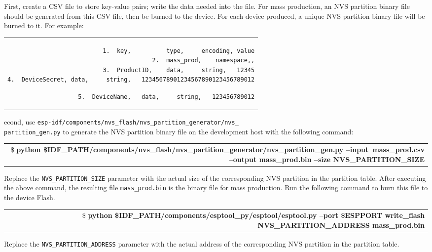 \documentclass[a4paper,12pt,openany]{book}
\renewcommand{\ttfamily}{\fontfamily{pcr}\selectfont}
\renewcommand{\arraystretch}{1}
\newenvironment{codebloc}{ %
    \ttfamily\footnotesize
    \renewcommand{\arraystretch}{1}
}
\newcommand{\note}[2][NOTE]{ %
\vspace{6pt}
\begin{tabular}{b{\textwidth}}
\hline
\fontfamily{phv}\selectfont \textbf{#1}\\
\leftskip 1em #2\\
\hline
\end{tabular}
}
\begin{document}
First, create a CSV file to store key-value pairs; write the data needed into the file. For mass production, an NVS partition binary file should be generated from this CSV file, then be burned to the device. For each device produced, a unique NVS partition binary file will be burned to it. For example:

\begin{codebloc}
\begin{tabular}{d}
\vspace{2pt}
\begin{verbatim}
1.  key,          type,     encoding, value
2.  mass_prod,    namespace,,
3.  ProductID,    data,     string,   12345
4.  DeviceSecret, data,     string,   12345678901234567890123456789012\end{verbatim}
\verb|5.  DeviceName,   data,     string,   123456789012|
\end{tabular}
\end{codebloc}


Second, use \texttt{esp-idf/components/nvs\_flash/nvs\_partition\_generator/nvs\_\\
partition\_gen.py} to generate the NVS partition binary file on the development host with the following command:

\begin{codebloc}
\begin{tabular}{d}
\$ \bfseries python \$IDF\_PATH/components/nvs\_flash/nvs\_partition\_generator/nvs\_partition\_\newline gen.py --input\ mass\_prod.csv --output mass\_prod.bin --size NVS\_PARTITION\_SIZE
\end{tabular}
\end{codebloc}

\note{Replace the \texttt{NVS\_PARTITION\_SIZE} parameter with the actual size of the corresponding NVS partition in the partition table. After executing the above command, the resulting file \texttt{mass\_prod.bin} is the binary file for mass production. Run the following command to burn this file to the device Flash.}

\begin{codebloc}
\begin{tabular}{d}
\$ \bfseries python \$IDF\_PATH/components/esptool\_py/esptool/esptool.py --port \$ESPPORT write\_flash NVS\_PARTITION\_ADDRESS mass\_prod.bin
\end{tabular}
\end{codebloc}

\note{Replace the \texttt{NVS\_PARTITION\_ADDRESS} parameter with the actual address of the corresponding NVS partition in the partition table.}
\end{document}
